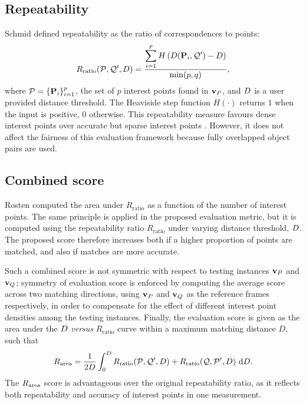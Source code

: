 \subsection{Repeatability}
Schmid \etal \cite{Schmid2000} defined repeatability as the ratio of correspondences to points:
\begin{equation}
R_\textrm{ratio}(\mathcal{P}, \mathcal{Q}', D) = \frac{\displaystyle\sum_{i=1}^p H\left(D(\mathbf{P}_i, \mathcal{Q}') - D\right)}{\min(p, q)},
\label{eqn/eval/repeatratio}
\end{equation}
where $\mathcal{P} = \{\mathbf{P}_i\}_{i=1}^{p}$, the set of $p$ interest points found in $\mathbf{v}_P$, and $D$ is a user provided distance threshold. 
The Heaviside step function $H(\cdot)$ returns $1$ when the input is positive, $0$ otherwise.
This repeatability measure favours dense interest points over accurate but sparse interest points \cite{Willis2009}. 
However, it does not affect the fairness of this evaluation framework because fully overlapped object pairs are used.

\subsection{Combined score}
Rosten \etal \cite{Rosten2010} computed the area under $R_\textrm{ratio}$ as a function of the number of interest points. 
The same principle is applied in the proposed evaluation metric, but it is computed using the repeatability ratio $R_\textrm{ratio}$ under varying distance threshold, $D$.  
The proposed score therefore increases both if a higher proportion of points are matched, and also if matches are more accurate. 

Such a combined score is not symmetric with respect to testing instances $\mathbf{v}_P$ and $\mathbf{v}_Q$; symmetry of evaluation score is enforced by computing the average score across two matching directions, using $\mathbf{v}_P$ and $\mathbf{v}_Q$ as the reference frames respectively, in order to compensate for the effect of different interest point densities among the testing instances. Finally, the evaluation score is given as the area under the $D$ \textit{versus} $R_\textrm{ratio}$ curve within a maximum matching distance $D$, such that  
\begin{equation}
R_\textrm{area}=\frac{1}{2D}\int_{0}^{D}R_\textrm{ratio}(\mathcal{P}, \mathcal{Q}', D) + R_\textrm{ratio}(\mathcal{Q}, \mathcal{P}', D) ~ \textrm{d}D.
\label{eqn/eval/rptarea}
\end{equation}
The $R_\textrm{area}$ score is advantageous over the original repeatability ratio, as it reflects both repeatability and accuracy of interest points in one measurement. 

